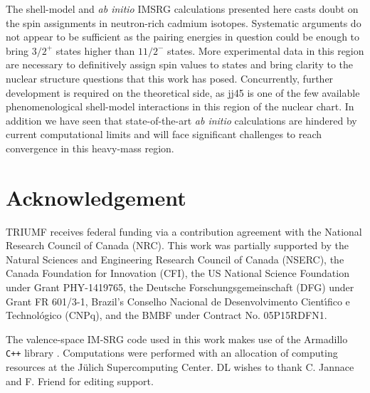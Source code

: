 \documentclass[twocolumn,prc,showpacs,preprintnumbers,amsmath,amssymb,superscriptaddress,nofootinbib,aps,10pt]{revtex4-1}
\begin{document}
The shell-model and \emph{ab initio} IMSRG calculations presented here casts doubt on the spin assignments in neutron-rich cadmium isotopes. Systematic arguments do not appear to be sufficient as the pairing energies in question could be enough to bring $3/2^+$ states higher than $11/2^-$ states. More experimental data in this region are necessary to definitively assign spin values to states and bring clarity to the nuclear structure questions that this work has posed. Concurrently, further development is required on the theoretical side, as jj45 is one of the few available phenomenological shell-model interactions in this region of the nuclear chart.  In addition we have seen that state-of-the-art \emph{ab initio} calculations are hindered by current computational limits and will face significant  challenges to reach convergence in this heavy-mass region.


\section*{Acknowledgement}
TRIUMF receives federal funding via a contribution agreement with the National Research Council of Canada (NRC). This work was partially supported by the Natural Sciences and Engineering Research Council of Canada (NSERC), the Canada Foundation for Innovation (CFI), the US National Science Foundation under Grant PHY-1419765, the Deutsche Forschungsgemeinschaft (DFG) under Grant FR 601/3-1, Brazil's Conselho Nacional de Desenvolvimento Cient\'{\i}fico e Technol\'{o}gico (CNPq), and the BMBF under Contract No. 05P15RDFN1.

The valence-space IM-SRG code used in this work makes use of the Armadillo \texttt{C++} library \cite{Armadillo}. Computations were performed with an allocation of computing resources at the J\"ulich Supercomputing Center.
DL wishes to thank C. Jannace and F. Friend for editing support.

%
\end{document}
